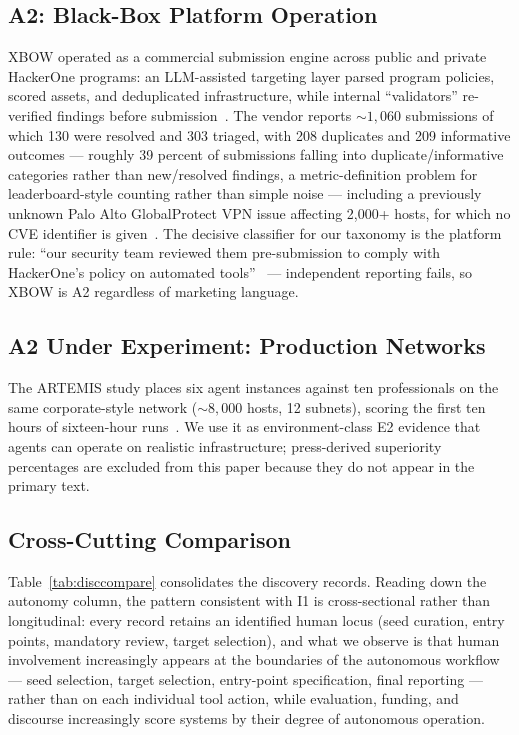 \subsection{A2: Black-Box Platform Operation}
XBOW operated as a commercial submission engine across public and private HackerOne programs:
an LLM-assisted targeting layer parsed program policies, scored assets, and deduplicated
infrastructure, while internal ``validators'' re-verified findings before
submission~\cite{xbowtop12025}. The vendor reports ${\sim}1{,}060$ submissions of which 130
were resolved and 303 triaged, with 208 duplicates and 209 informative outcomes --- roughly 39
percent of submissions falling into duplicate/informative categories rather than new/resolved
findings, a metric-definition problem for leaderboard-style counting rather than simple noise
--- including a previously unknown Palo Alto GlobalProtect VPN issue affecting 2{,}000+ hosts,
for which no CVE identifier is given~\cite{xbowtop12025}. The decisive classifier for our
taxonomy is the platform rule: ``our security team reviewed them pre-submission to comply with
HackerOne's policy on automated tools''~\cite{xbowtop12025} --- independent reporting fails,
so XBOW is A2 regardless of marketing language.

\subsection{A2 Under Experiment: Production Networks}
The ARTEMIS study places six agent instances against ten professionals on the same
corporate-style network (${\sim}8{,}000$ hosts, 12 subnets), scoring the first ten hours of
sixteen-hour runs~\cite{artemis2025comparing}. We use it as environment-class E2 evidence that
agents can operate on realistic infrastructure; press-derived superiority percentages are
excluded from this paper because they do not appear in the primary text.

\subsection{Cross-Cutting Comparison}
Table~\ref{tab:disccompare} consolidates the discovery records. Reading down the autonomy
column, the pattern consistent with I1 is cross-sectional rather than longitudinal: every record retains an
identified human locus (seed curation, entry points, mandatory review, target selection), and what
we observe is that human involvement increasingly appears at the boundaries of the autonomous
workflow --- seed selection, target selection, entry-point specification, final reporting --- rather
than on each individual tool action, while evaluation, funding, and discourse increasingly score
systems by their degree of autonomous operation.

